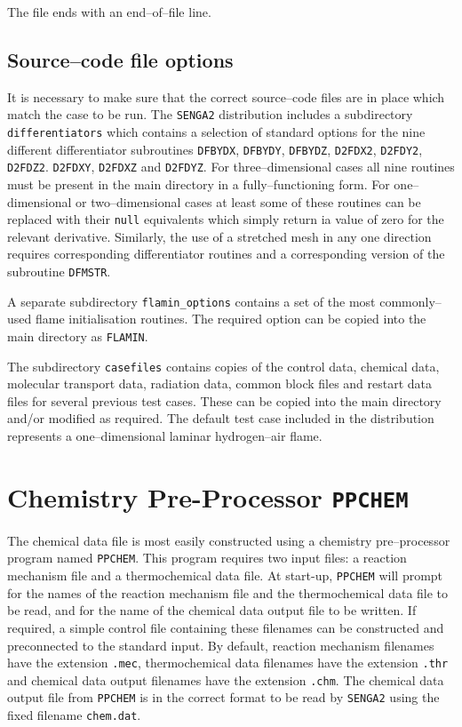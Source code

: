 \documentclass[dvips]{article}
\begin{document}
\noindent
The file ends with an end--of--file line.

\subsection{Source--code file options}
It is necessary to make sure that the correct source--code files 
are in place which match the case to be run.  The {\tt SENGA2}
distribution includes a subdirectory {\tt differentiators} which
contains a selection of standard options for the nine different differentiator
subroutines {\tt DFBYDX}, {\tt DFBYDY}, {\tt DFBYDZ}, {\tt D2FDX2},
{\tt D2FDY2}, {\tt D2FDZ2}. {\tt D2FDXY}, {\tt D2FDXZ} and {\tt D2FDYZ}.  For
three--dimensional cases all nine routines must be present in the main
directory in a fully--functioning form.  For one--dimensional or
two--dimensional cases at least some of these routines can be replaced
with their {\tt null} equivalents which simply return ia value of zero for the
relevant derivative.  Similarly, the use of a stretched
mesh in any one direction requires corresponding differentiator
routines and a corresponding version of the subroutine {\tt DFMSTR}.

A separate subdirectory {\tt flamin\_options} contains a set of the most
commonly--used flame initialisation routines.  The required option can be
copied into the main directory as {\tt FLAMIN}.

The subdirectory {\tt casefiles} contains copies of the control data,
chemical data, molecular transport data, radiation data, common block files
and restart data files for several previous test cases.  These can be
copied into the main directory and/or modified as required.  The
default test case included in the distribution represents a one--dimensional
laminar hydrogen--air flame.


\newpage
\section{Chemistry Pre-Processor {\tt PPCHEM}}
The chemical data file is most easily constructed using a chemistry 
pre--processor program named {\tt PPCHEM}.  This program requires two input
files: a reaction mechanism file and a thermochemical data file.  At start-up,
{\tt PPCHEM} will prompt for the names of the reaction mechanism file and the
thermochemical data file to be read, and for the name of the chemical data
output file to be written.  If required, a simple control file
containing these filenames can be constructed
and preconnected to the standard input.
By default, reaction mechanism filenames have the extension {\tt .mec},
thermochemical data filenames have the extension {\tt .thr} and chemical
data output filenames have the extension {\tt .chm}.  The chemical data
output file from {\tt PPCHEM} is in the correct format to be read by
{\tt SENGA2} using the fixed filename {\tt chem.dat}.
\end{document}
